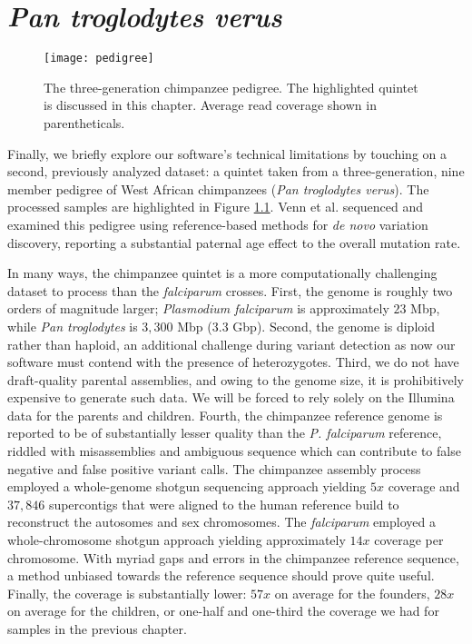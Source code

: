 \chapter{\textit{Pan troglodytes verus}}
\label{ch:chimp}

\begin{figure}[h!]
  \centering
    \texttt{[image: pedigree]}
  \caption{The three-generation chimpanzee pedigree.  The highlighted quintet is discussed in this chapter.  Average read coverage shown in parentheticals.}
  \label{fig:pedigree}
\end{figure}

Finally, we briefly explore our software's technical limitations by touching on a second, previously analyzed dataset: a quintet taken from a three-generation, nine member pedigree of West African chimpanzees (\textit{Pan troglodytes verus}).  The processed samples are highlighted in Figure \ref{fig:pedigree}.  Venn {et al.} sequenced and examined this pedigree using reference-based methods for \textit{de novo} variation discovery, reporting a substantial paternal age effect to the overall mutation rate\cite{Venn:2014ep}.

In many ways, the chimpanzee quintet is a more computationally challenging dataset to process than the \textit{falciparum} crosses.  First, the genome is roughly two orders of magnitude larger; \textit{Plasmodium falciparum} is approximately $23$ Mbp, while \textit{Pan troglodytes} is $3,300$ Mbp ($3.3$ Gbp).  Second, the genome is diploid rather than haploid, an additional challenge during variant detection as now our software must contend with the presence of heterozygotes.  Third, we do not have draft-quality parental assemblies, and owing to the genome size, it is prohibitively expensive to generate such data.  We will be forced to rely solely on the Illumina data for the parents and children.  Fourth, the chimpanzee reference genome is reported to be of substantially lesser quality than the \textit{P. falciparum} reference, riddled with misassemblies and ambiguous sequence which can contribute to false negative and false positive variant calls\cite{Mallick:2009go}.  The chimpanzee assembly process employed a whole-genome shotgun sequencing approach yielding $5x$ coverage and $37,846$ supercontigs that were aligned to the human reference build to reconstruct the autosomes and sex chromosomes\cite{ChimpanzeeSequencingandAnalysisConsortium:2005fa}.  The \textit{falciparum} employed a whole-chromosome shotgun approach yielding approximately $14x$ coverage per chromosome.  With myriad gaps and errors in the chimpanzee reference sequence, a method unbiased towards the reference sequence should prove quite useful.  Finally, the coverage is substantially lower: $57x$ on average for the founders, $28x$ on average for the children, or one-half and one-third the coverage we had for samples in the previous chapter.

